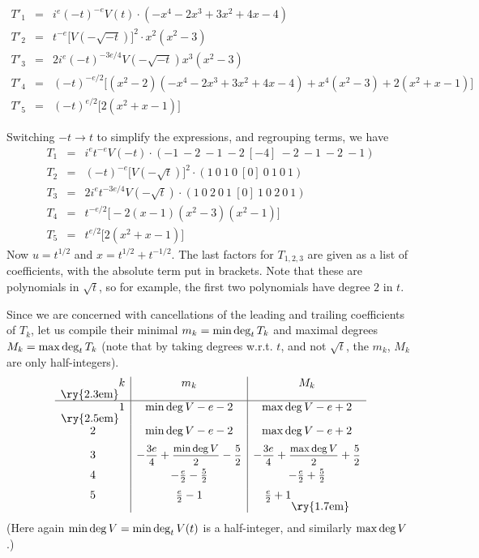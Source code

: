 \begin{eqnarray*}
T'_1 & = & i^e(-t)^{-e}V(t)\cdot (-x^4-2x^3+3x^2+4x-4) \\
T'_2 & = & t^{-e}\bigl[V(-\sqrt{-t})\bigr]^2\cdot x^2(x^2-3) \\
T'_3 & = & 2i^e(-t)^{-3e/4}V(-\sqrt{-t})x^3(x^2-3) \\
T'_4 & = & (-t)^{-e/2}\bigl[(x^2-2)(-x^4-2x^3+3x^2+4x-4)+x^4(x^2-3)+2(x^2+x-1)
 \bigr] \\
T'_5 & = & (-t)^{e/2}\bigl[2(x^2+x-1) \bigr] 
\end{eqnarray*}

Switching $-t\to t$ to simplify the expressions, and regrouping terms, 
we have
\begin{eqnarray*}
T_1 & = & i^et^{-e}V(-t)\cdot (-1\ -2\ -1\ -2\ [-4]\ -2\ -1\ -2\ -1) \\
T_2 & = & (-t)^{-e}\bigl[V(-\sqrt{t})\bigr]^2\cdot (1\ 0\ 1\ 0\ [0]\ 0\ 1\ 0\ 1) \\
T_3 & = & 2i^et^{-3e/4}V(-\sqrt{t})\cdot (1\ 0\ 2\ 0\ 1\ [0]\ 1\ 0\ 2\ 0\ 1) \\
T_4 & = & t^{-e/2}\bigl[-2(x-1)(x^2-3)(x^2-1) \bigr] \\
T_5 & = & t^{e/2}\bigl[2(x^2+x-1) \bigr] 
\end{eqnarray*}
Now $u=t^{1/2}$ and $x=t^{1/2}+t^{-1/2}$. The last factors for $T_
{1,2,3}$ are given as a list of coefficients, with the absolute term
put in brackets. Note that these are polynomials in $\sqrt{t}$, so for
example, the first two polynomials have degree $2$ in $t$.

Since we are concerned with cancellations of the leading and trailing
coefficients of $T_k$, let us compile their minimal $m_k=\min\deg_tT_k$ and
maximal degrees $M_k=\max\deg_tT_k$ (note that by taking degrees w.r.t.
$t$, and not $\sqrt{t}$, the $m_k$, $M_k$ are only half-integers).
\[
\begin{array}{c|c|c}
\raisebox{-1em}{\ry{2.3em}} k & m_k & M_k \\
\hline
\raisebox{-1em}{\ry{2.5em}}1 & \md V-e-2 & \Md V-e+2 \\[2mm]
2 & \md V-e-2 & \Md V-e+2 \\[2mm]
3 & -\ffrac{3e}{4}+\ffrac{\md V}{2}-\ffrac{5}{2} & -\ffrac{3e}{4}+
    \ffrac{\Md V}{2}+\ffrac{5}{2}\\[2mm]
4 & -\frac{e}{2}-\frac{5}{2} & -\frac{e}{2}+\frac{5}{2} \\[2mm]
5 & \frac{e}{2}-1 & \frac{e}{2}+1\raisebox{-1em}{\ry{1.7em}}
\end{array}
\]
(Here again $\min\deg V=\min\deg_t V(t)$ is a half-integer, and similarly
$\max\deg V$.)

